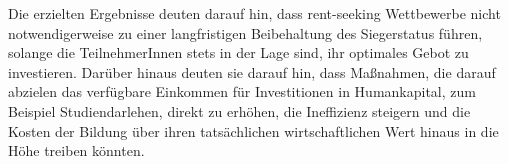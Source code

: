 \begin{small}
Die erzielten Ergebnisse deuten darauf hin, dass rent-seeking Wettbewerbe nicht notwendigerweise zu einer langfristigen Beibehaltung des  Siegerstatus führen, solange die TeilnehmerInnen stets in der Lage sind, ihr optimales Gebot zu investieren. Darüber hinaus deuten sie darauf hin, dass Maßnahmen, die darauf abzielen das verfügbare Einkommen für Investitionen in Humankapital, zum Beispiel Studiendarlehen, direkt zu erhöhen, die Ineffizienz steigern und die Kosten der Bildung über ihren tatsächlichen wirtschaftlichen Wert hinaus in die Höhe treiben könnten.
\end{small}